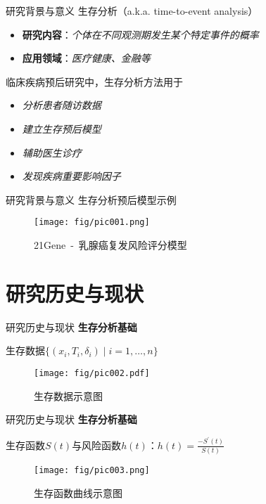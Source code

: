 \documentclass[10pt]{beamer}
\begin{document}
\begin{frame}{研究背景与意义}
  生存分析（a.k.a. time-to-event analysis）
  \begin{itemize}
    \item \textbf{研究内容}：\textit{个体在不同观测期发生某个特定事件的概率}
    \item \textbf{应用领域}：\textit{医疗健康、金融等}
  \end{itemize}

  临床疾病预后研究中，生存分析方法用于
  \begin{itemize}
    \item \textit{分析患者随访数据}
    \item \textit{建立生存预后模型}
    \item \textit{辅助医生诊疗}
    \item \textit{发现疾病重要影响因子}
  \end{itemize}
\end{frame}

\begin{frame}{研究背景与意义}
  生存分析预后模型示例
  \begin{figure}[H]
    \centering
    \texttt{[image: fig/pic001.png]}
    \caption{21Gene\ -\ 乳腺癌复发风险评分模型}
  \end{figure}
\end{frame}

\section{研究历史与现状}

\begin{frame}{研究历史与现状}
  \textbf{生存分析基础}
  
  生存数据$\{(x_i,T_i,\delta_i ) \mid i=1,\dots,n\}$
  \begin{figure}[H]
    \centering
    \texttt{[image: fig/pic002.pdf]}
    \caption{生存数据示意图}
  \end{figure}
\end{frame}

\begin{frame}{研究历史与现状}
  \textbf{生存分析基础}
  
  生存函数$S(t)$与风险函数$h(t)$：$h(t)=\frac{-S^{'}(t)}{S(t)}$
  \begin{figure}[H]
    \centering
    \texttt{[image: fig/pic003.png]}
    \caption{生存函数曲线示意图}
  \end{figure}
\end{frame}
\end{document}
